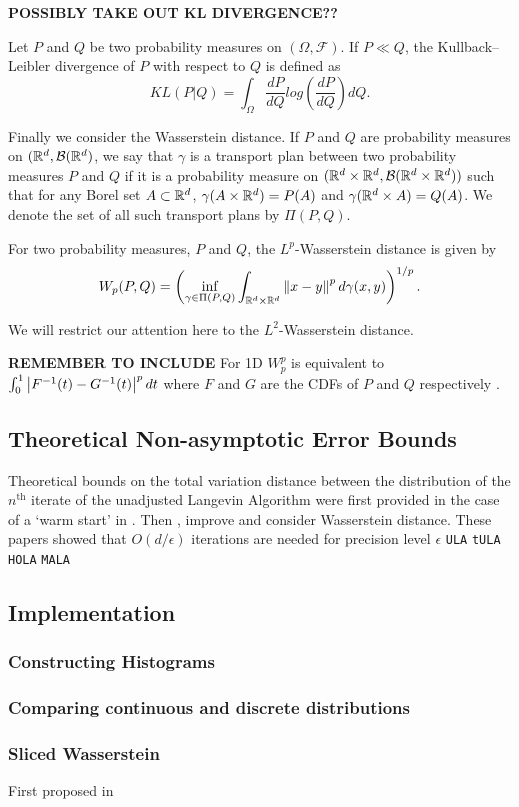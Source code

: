 \textbf{POSSIBLY TAKE OUT KL DIVERGENCE??}
\begin{defn}
Let $P$ and $Q$ be two probability measures on $(\Omega, \mathcal{F})$.  If $P \ll Q$, the Kullback--Leibler divergence of $P$ with respect to $Q$ is defined as
$$
KL(P|Q) = \int_\Omega \frac{d P}{d Q} log \left(  \frac{d P}{d Q} \right) d Q.
$$
\end{defn}
Finally we consider the Wasserstein distance.  If $P$ and $Q$ are probability measures on $(\mathbb{R}^d,\mathcal{B}(\mathbb{R}^d)$, we say that $\gamma$ is a transport plan between two probability measures $P$ and $Q$ if it is a probability measure on $(\mathbb{R}^d \times \mathbb{R}^d, \mathcal{B}(\mathbb{R}^d \times \mathbb{R}^d))$ such that for any Borel set $A \subset \mathbb{R}^d$, $\gamma(A \times \mathbb{R}^d)=P(A)$ and $\gamma(\mathbb{R}^d \times A) = Q(A)$.  We denote the set of all such transport plans by $\Pi(P,Q)$.
\begin{defn}
For two probability measures, $P$ and $Q$, the $L^p$-Wasserstein distance is given by
$$
W_p(P,Q) = \left( \inf_{\gamma \in \Pi(P,Q)} \int_{\R^d \times \R^d} \norm{x-y}^p d \gamma(x,y) \right)^{1/p}.
$$
\end{defn}
We will restrict our attention here to the $L^2$-Wasserstein distance.

\textbf{REMEMBER TO INCLUDE} For 1D $W_p^p$ is equivalent to $\int_0^1 \abs{F^{-1}(t)-G^{-1}(t)}^p dt$ where $F$ and $G$ are the CDFs of $P$ and $Q$ respectively \cite{ramdas2017wasserstein}.

\subsection{Theoretical Non-asymptotic Error Bounds}
Theoretical bounds on the total variation distance between the distribution of the $n^\text{th}$ iterate of the unadjusted Langevin Algorithm were first provided in the case of a `warm start' in \cite{dalalyan2017theoretical}.  Then \cite{durmus2016high}, \cite{durmus2017nonasymptotic} improve and consider Wasserstein distance.  These papers showed that $O(d/\epsilon)$ iterations are needed for precision level $\epsilon$
\texttt{ULA} \cite{dalalyan2019user}
\texttt{tULA} \cite{brosse2018tamed}
\texttt{HOLA} \cite{tHOLA}
\texttt{MALA} \cite{bou2013nonasymptotic}
\subsection{Implementation}
\subsubsection{Constructing Histograms}
\subsubsection{Comparing continuous and discrete distributions}
\subsubsection{Sliced Wasserstein}
First proposed in \cite{rabin2011wasserstein}
